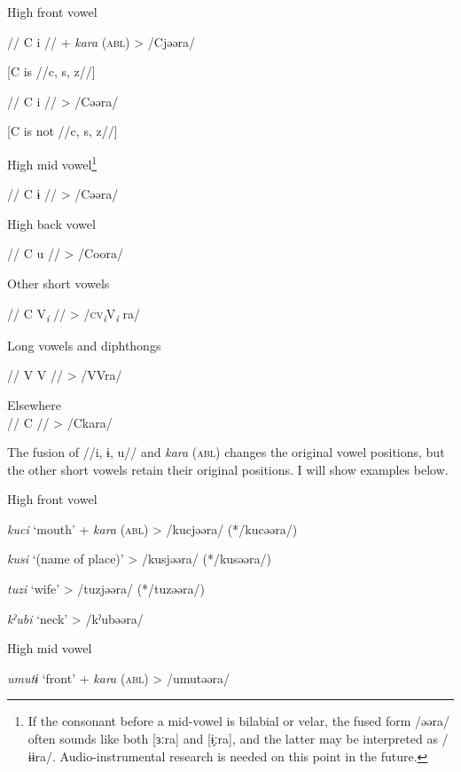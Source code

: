 \begin{table}
\ea\label{ex:6-33} \ea High front vowel\\
\gll

    //  C  i  //  +  \textit{kara} (\textsc{abl})  >  /Cjəəra/

    [C is //c, s, z//]

    //  C  i  //      >  /Cəəra/

    [C is not //c, s, z//]

\ex High mid vowel\footnote{If the consonant before a mid-vowel is bilabial or velar, the fused form /əəra/ often sounds like both [ɜːra] and [ɨ̞ːra], and the latter may be interpreted as /ɨɨra/. Audio-instrumental research is needed on this point in the future.}\\
\gll

    //  C  ɨ  //      >  /Cəəra/

\ex High back vowel\\
\gll

    //  C  u  //      >  /Coora/

\ex Other short vowels\\
\gll

    //  C  V\textit{\textsubscript{i}}  //      >  /\textsc{cv}\textit{\textsubscript{i}}V\textit{\textsubscript{i} }ra/

\ex Long vowels and diphthongs\\
\gll

    //  V  V  //      >  /VVra/

\ex  Elsewhere\\

    //  C  //        >  /Ckara/

The fusion of //i, ɨ, u// and \textit{kara} (\textsc{abl}) changes the original vowel positions, but the other short vowels retain their original positions. I will show examples below.

\ea\label{ex:6-34}
 \ea High front vowel  \\
\gll

    \textit{kuci}  ‘mouth’  +  \textit{kara} (\textsc{abl})  >  /kucjəəra/  (*/kucəəra/)

    \textit{kusi}  ‘(name of place)’      >  /kusjəəra/  (*/kusəəra/)

    \textit{tuzi}  ‘wife’      >  /tuzjəəra/  (*/tuzəəra/)

    \textit{kˀubi}  ‘neck’      >  /kˀubəəra/  

\ex High mid vowel\\
\gll

    \textit{umutɨ}  ‘front’  +  \textit{kara} (\textsc{abl})  >  /umutəəra/


\end{table}
